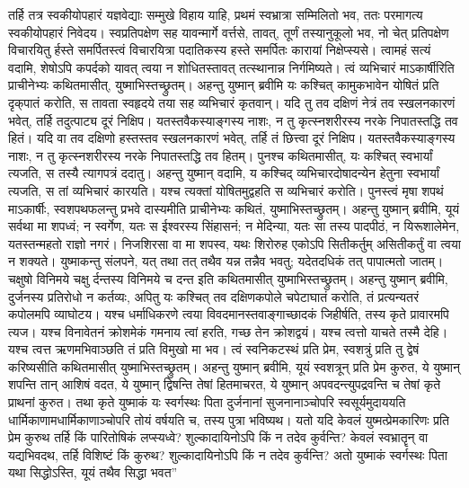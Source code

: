 \vakya तर्हि तत्र स्वकीयोपहारं यज्ञवेद्याः सम्मुखे विहाय याहि, प्रथमं स्वभ्रात्रा सम्मिलितो भव, ततः परमागत्य स्वकीयोपहारं निवेदय।
\vakya स्वप्रतिपक्षेण सह यावन्मार्गे वर्त्तसे, तावत्, तूर्णं तस्यानुकूलो भव, नो चेत् प्रतिपक्षेण विचारयितु र्हस्ते समर्पितस्त्वं विचारयित्रा पदातिकस्य हस्ते समर्पितः कारायां निक्षेप्स्यसे।
\vakya त्वामहं सत्यं वदामि, शेषोऽपि कपर्दको यावत् त्वया न शोधितस्तावत् तत्स्थानान्न निर्गमिष्यते।
\vakya त्वं व्यभिचारं माऽकार्षीरिति प्राचीनेभ्यः कथितमासीत्, युष्माभिस्तच्छ्रुतम्।
\vakya अहन्तु युष्मान् ब्रवीमि यः कश्चित् कामुकभावेन योषितं प्रति दृक्‌पातं करोति, स तावता स्वहृदये तया सह व्यभिचारं कृतवान्।
\vakya यदि तु तव दक्षिणं नेत्रं तव स्खलनकारणं भवेत्, तर्हि तदुत्पाट्य दूरं निक्षिप। यतस्तवैकस्याङ्गस्य नाशः, न तु कृत्स्नशरीरस्य नरके निपातस्तद्धि तव हितं।
\vakya यदि वा तव दक्षिणो हस्तस्तव स्खलनकारणं भवेत्, तर्हि तं छित्त्वा दूरं निक्षिप। यतस्तवैकस्याङ्गस्य नाशः, न तु कृत्स्नशरीरस्य नरके निपातस्तद्धि तव हितम्।
\vakya पुनश्च कथितमासीत्, यः कश्चित् स्वभार्यां त्यजति, स तस्यै त्यागपत्रं ददातु।
\vakya अहन्तु युष्मान् वदामि, य कश्चिद् व्यभिचारदोषादन्येन हेतुना स्वभार्यां त्यजति, स तां व्यभिचारं कारयति। यश्च त्यक्तां योषितमुद्वहति स व्यभिचारं करोति।
\vakya पुनस्त्वं मृषा शपथं माऽकार्षीः, स्वशपथफलन्तु प्रभवे दास्यमीति प्राचीनेभ्यः कथितं, युष्माभिस्तच्छ्रुतम्।
\vakya अहन्तु युष्मान् ब्रवीमि, यूयं सर्वथा मा शपध्वं; न स्वर्गेण, यतः स ईश्वरस्य सिंहासनं;
\vakya न मेदिन्या, यतः सा तस्य पादपीठं, न यिरूशालेमेन, यतस्तन्महतो राज्ञो नगरं।
\vakya निजशिरसा वा मा शपस्व, यथः शिरोरुह एकोऽपि सितीकर्तुम् असितीकर्तुं वा त्वया न शक्यते।
\vakya युष्माकन्तु संलपने, यत् तथा तत् तथैव यन्न तन्नैव भवतु; यदेतदधिकं तत् पापात्मतो जातम्।
\vakya चक्षुषो विनिमये चक्षु र्दन्तस्य विनिमये च दन्त इति कथितमासीत् युष्माभिस्तच्छ्रुतम्।
\vakya अहन्तु युष्मान् ब्रवीमि, दुर्जनस्य प्रतिरोधो न कर्तव्यः, अपितु यः कश्चित् तव दक्षिणकपोले चपेटाघातं करोति, तं प्रत्यन्यतरं कपोलमपि व्याघोटय।
\vakya यश्च धर्माधिकरणे त्वया विवदमानस्तवाङ्गाच्छादकं जिहीर्षति, तस्य कृते प्रावारमपि त्यज।
\vakya यश्च विनावेतनं क्रोशमेकं गमनाय त्वां हरति, गच्छ तेन क्रोशद्वयं।
\vakya यश्च त्वत्तो याचते तस्मै देहि। यश्च त्वत्त ऋणमभिवाञ्छति तं प्रति विमुखो मा भव।
\vakya त्वं स्वनिकटस्थं प्रति प्रेम, स्वशत्रुं प्रति तु द्वेषं करिष्यसीति कथितमासीत् युष्माभिस्तच्छ्रुतम्।
\vakya अहन्तु युष्मान् ब्रवीमि, यूयं स्वशत्रून् प्रति प्रेम कुरुत, ये युष्मान् शपन्ति तान् आशिषं वदत, ये युष्मान् द्विषन्ति तेषां हितमाचरत, ये युष्मान् अपवदन्त्युपद्रवन्ति च तेषां कृते प्राथनां कुरुत।
\vakya तथा कृते युष्माकं यः स्वर्गस्थः पिता दुर्जनानां सुजनानाञ्चोपरि स्वसूर्यमुदाययति धार्मिकाणामधार्मिकाणाञ्चोपरि तोयं वर्षयति च, तस्य पुत्रा भविष्यथ।
\vakya यतो यदि केवलं युष्मत्प्रेमकारिणः प्रति प्रेम कुरुथ तर्हि किं पारितोषिकं लप्स्यध्वे?
\vakya शुल्कादायिनोऽपि किं न तदेव कुर्वन्ति? केवलं स्वभ्रातॄन् वा यद्यभिवदथ, तर्हि विशिष्टं किं कुरुथ? शुल्कादायिनोऽपि किं न तदेव कुर्वन्ति?
\vakya अतो युष्माकं स्वर्गस्थः पिता यथा सिद्धोऽस्ति, यूयं तथैव सिद्धा भवत”\eoc